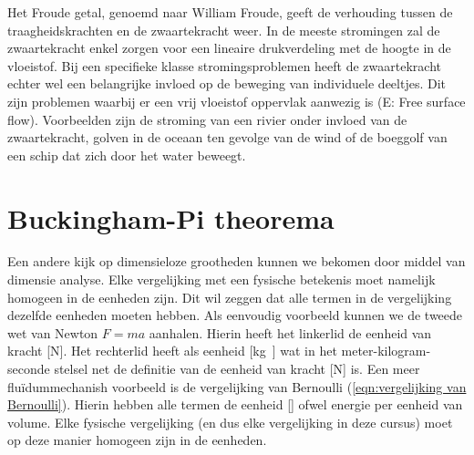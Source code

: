 Het Froude getal, genoemd naar William Froude, geeft de verhouding tussen de traagheidskrachten en de zwaartekracht weer. In de meeste stromingen zal de zwaartekracht enkel zorgen voor een lineaire drukverdeling met de hoogte in de vloeistof. Bij een specifieke klasse stromingsproblemen heeft de zwaartekracht echter wel een belangrijke invloed op de beweging van individuele deeltjes. Dit zijn problemen waarbij er een vrij vloeistof oppervlak aanwezig is (E: Free surface flow). Voorbeelden zijn de stroming van een rivier onder invloed van de zwaartekracht, golven in de oceaan ten gevolge van de wind of de boeggolf van een schip dat zich door het water beweegt.

	\section{Buckingham-Pi theorema}
Een andere kijk op dimensieloze grootheden kunnen we bekomen door middel van dimensie analyse. Elke vergelijking met een fysische betekenis moet namelijk homogeen in de eenheden zijn. Dit wil zeggen dat alle termen in de vergelijking dezelfde eenheden moeten hebben. Als eenvoudig voorbeeld kunnen we de tweede wet van Newton $F=ma$ aanhalen. Hierin heeft het linkerlid de eenheid van kracht [\unit{N}]. Het rechterlid heeft als eenheid [\unit{kg }] wat in het meter-kilogram-seconde stelsel net de definitie van de eenheid van kracht [\unit{N}] is. Een meer fluïdummechanish voorbeeld is de vergelijking van Bernoulli (\ref{eqn:vergelijking van Bernoulli}). Hierin hebben alle termen de eenheid [\unit{}] ofwel energie per eenheid van volume. Elke fysische vergelijking (en dus elke vergelijking in deze cursus) moet op deze manier homogeen zijn in de eenheden.


